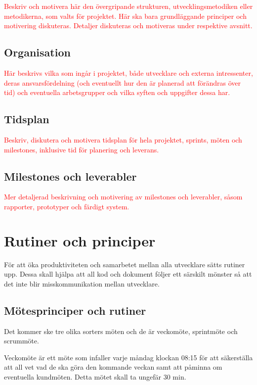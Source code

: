 \documentclass[a4paper,12pt,oneside,final]{extbook}
\begin{document}
\textcolor{red}{Beskriv och motivera här den övergripande strukturen, utvecklingsmetodiken eller metodikerna, som
	valts för projektet. Här ska bara grundläggande principer och motivering diskuteras. Detaljer diskuteras
	och motiveras under respektive avsnitt.
}

\section{Organisation}

\textcolor{red}{Här beskrivs vilka som ingår i projektet, både utvecklare och externa intressenter, deras ansvarsfördelning
	(och eventuellt hur den är planerad att förändras över tid) och eventuella arbetsgrupper och
	vilka syften och uppgifter dessa har.}

\section{Tidsplan}

\textcolor{red}{Beskriv, diskutera och motivera tidsplan för hela projektet, sprints, möten och milestones, inklusive
tid för planering och leverans.}

\section{Milestones och leverabler}

\textcolor{red}{Mer detaljerad beskrivning och motivering av milestones och leverabler, såsom rapporter, prototyper
och färdigt system.
}


\chapter{Rutiner och principer}

För att öka produktiviteten och samarbetet mellan alla utvecklare sätts rutiner upp. Dessa skall hjälpa att all kod och dokument följer ett särskilt mönster så att det inte blir misskommunikation mellan utvecklare.

\section{Mötesprinciper och rutiner}

Det kommer ske tre olika sorters möten och de är veckomöte, sprintmöte och scrummöte.  

Veckomöte är ett möte som infaller varje måndag klockan 08:15 för att säkerställa att all vet vad de ska göra den kommande veckan samt att påminna om eventuella kundmöten. Detta mötet skall ta ungefär 30 min.
\end{document}
